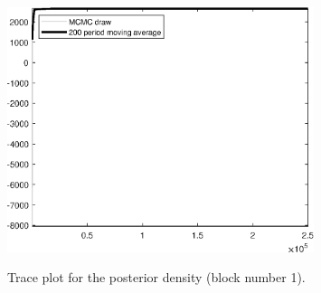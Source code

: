 \begin{figure}[H]
\centering
  \includegraphics[width=0.8\textwidth]{BRS_extended_fd/graphs/TracePlot_Posterior_blck_1}\\
    \caption{Trace plot for the posterior density (block number 1).}
\end{figure}
